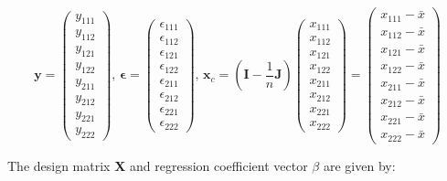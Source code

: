\documentclass[11pt]{article}
\begin{document}
\[ 
\mathbf{y} = \begin{pmatrix} y_{111} \\ y_{112} \\  y_{121}
\\ y_{122} \\ y_{211} \\ y_{212} \\ y_{221} \\ y_{222}
\end{pmatrix},\, 
\mathbf{\epsilon} = \begin{pmatrix} \epsilon_{111} \\ \epsilon_{112} \\  \epsilon_{121}
\\ \epsilon_{122} \\ \epsilon_{211} \\ \epsilon_{212}
\\ \epsilon_{221} \\ \epsilon_{222} \end{pmatrix},\, 
\mathbf{x}_c = (\mathbf{I}-
\frac{1}{n} \mathbf{J}) \begin{pmatrix} x_{111} \\ x_{112} \\  x_{121}
\\ x_{122} \\ x_{211} \\ x_{212} \\ x_{221} \\ x_{222} \end{pmatrix}
= \begin{pmatrix} x_{111} -\bar{x} \\ x_{112} - \bar{x} \\  x_{121} - \bar{x}
\\ x_{122} -\bar{x} \\ x_{211} -\bar{x} \\ x_{212} -\bar{x}
\\ x_{221} - \bar{x} \\ x_{222} -\bar{x} \end{pmatrix}\]


The design matrix \textbf{X}  and regression coefficient vector \textbf{$\beta$} are given by: 
\end{document}
